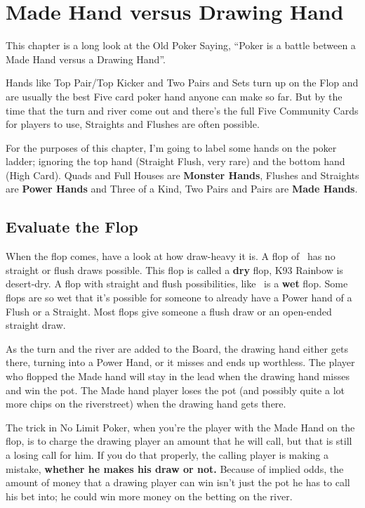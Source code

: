 \chapter{Made Hand versus Drawing Hand}


This chapter is a long look at the Old Poker Saying, ``Poker
is a battle between a Made Hand versus a Drawing Hand''.

Hands like Top Pair/Top Kicker and Two Pairs and Sets turn up on the
Flop and are usually the best Five card poker hand anyone can
make so far. But by the time that the turn and river come out and
there's the full Five Community Cards for players to use, Straights
and Flushes are often possible.

For the purposes of this chapter, I'm going to label some hands on the
poker ladder; ignoring the top hand (Straight Flush, very rare) and
the bottom hand (High Card). Quads and Full Houses are \textbf{Monster
Hands}, Flushes and Straights are \textbf{Power Hands} and Three of a
Kind, Two Pairs and Pairs are \textbf{Made Hands}.


\section{Evaluate the Flop}

When the flop comes, have a look at how draw-heavy it is. A flop of
\Ks\nineh\trec\ has no straight or flush draws possible. This flop is
called a \textbf{dry} flop, K93 Rainbow is desert-dry. A flop with
straight and flush possibilities, like \tend\nined\sixh\ is a
\textbf{wet} flop. Some flops are so wet that it's possible for
someone to already have a Power hand of a Flush or a Straight. Most
flops give someone a flush draw or an open-ended straight draw.

As the turn and the river are added to the Board, the drawing hand
either gets there, turning into a Power Hand, or it misses and ends up
worthless. The player who flopped the Made hand will stay in the lead
when the drawing hand misses and win the pot. The Made hand player
loses the pot (and possibly quite a lot more chips on the riverstreet)
when the drawing hand gets there.

The trick in No Limit Poker, when you're the player with the Made Hand
on the flop, is to charge the drawing player an amount that he will
call, but that is still a losing call for him. If
you do that properly, the calling player is making a mistake,
\textbf{whether he makes his draw or not.} Because of implied odds,
the amount of money that a drawing player can win isn't just the pot
he has to call his bet into; he could win more money on the betting on
the river.

